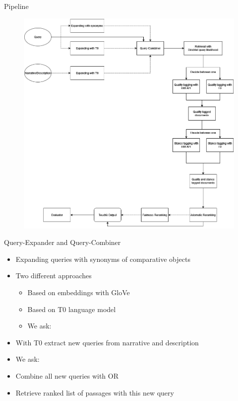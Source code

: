 \documentclass[english]{mlutalk}
\begin{document}
\begin{frame}{Pipeline}
    \begin{figure}
        \centering
        \includegraphics[scale=0.25]{figures/pipeline}
    \end{figure}
\end{frame}

\begin{frame}{Query-Expander and Query-Combiner}
    \begin{itemize}
        \item Expanding queries with synonyms of comparative objects
        \item Two different approaches
        \begin{itemize}
            \item Based on embeddings with GloVe
            \item Based on T0 language model~\cite{SanhWRBSACSLRDBXTSSKCNDCJWMSYPBWNRSSFFTBGBWR2021}
            \item We ask: 
        \end{itemize}
        \item With T0 extract new queries from narrative and description
        \item We ask: 
        \item Combine all new queries with OR
        \item Retrieve ranked list of passages with this new query
    \end{itemize}
\end{frame}
\end{document}
